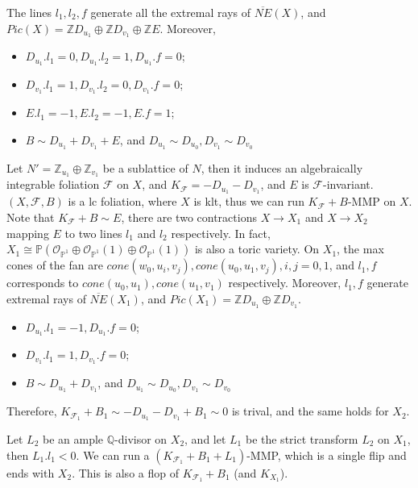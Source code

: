 \documentclass{article}
\begin{document}
The lines $l_{1},l_{2},f$ generate all the extremal rays of $ \overline{NE}(X)$, and $Pic(X)=\mathbb{Z}D_{u_{1}} \oplus \mathbb{Z}D_{v_{1}} \oplus \mathbb{Z}E$. Moreover,
\begin{itemize}
  \item $D_{u_{1}}.l_{1}=0,D_{u_{1}}.l_{2}=1,D_{u_{1}}.f=0$;
  \item $D_{v_{1}}.l_{1}=1,D_{v_{1}}.l_{2}=0,D_{v_{1}}.f=0$;
  \item $E.l_{1}=-1,E.l_{2}=-1,E.f=1$;
  \item $B\sim D_{u_{1}}+D_{v_{1}}+E$, and $D_{u_{1}}\sim D_{u_{0}},D_{v_{1}}\sim D_{v_{0}}$
\end{itemize}
Let $N'=\mathbb{Z}_{u_{1}} \oplus \mathbb{Z}_{v_{1}}$ be a sublattice of  $N$, then it induces an algebraically integrable foliation $\mathcal{F}$ on  $X$, and $K_{\mathcal{F}}=-D_{u_{1}}-D_{v_{1}}$, and $E$ is $\mathcal{F}$-invariant. $(X,\mathcal{F},B)$ is a lc foliation, where  $X$ is klt, thus we can run $K_{\mathcal{F}}+B$-MMP on $X$. Note that $K_{\mathcal{F}}+B\sim E$, there are two contractions $X\to X_{1}$ and $X \to X_{2}$  mapping $E$  to two lines $l_{1}$ and $l_{2}$ respectively.
In fact, $X_{1} \cong \mathbb{P}(\mathcal{O}_{\mathbb{P}^{1}}\oplus\mathcal{O}_{\mathbb{P}^{1}}(1)\oplus\mathcal{O}_{\mathbb{P}^{1}}(1))$ is also a toric variety.
On $X_{1}$, the max cones of the fan are $cone(w_{0},u_{i},v_{j}),cone(u_{0},u_{1},v_{j}),i,j=0,1$, and $l_{1},f$ corresponds to $cone(u_{0},u_{1}),cone(u_{1},v_{1})$ respectively. Moreover, $l_{1},f$ generate extremal rays of $ \overline{NE}(X_{1})$, and $Pic(X_{1})=\mathbb{Z}D_{u_{1}} \oplus \mathbb{Z}D_{v_{1}}$.
\begin{itemize}
  \item $D_{u_{1}}.l_{1}=-1,D_{u_{1}}.f=0$;
  \item $D_{v_{1}}.l_{1}=1,D_{v_{1}}.f=0$;
  \item $B\sim D_{u_{1}}+D_{v_{1}}$, and $D_{u_{1}}\sim D_{u_{0}},D_{v_{1}}\sim D_{v_{0}}$
\end{itemize}
Therefore, $K_{\mathcal{F}_{1}}+B_{1}\sim -D_{u_{1}}-D_{v_{1}}+B_{1}\sim 0$ is trival, and the same holds for $X_{2}$.

Let $L_{2}$ be an ample $\mathbb{Q}$-divisor on $X_{2}$, and let $L_{1}$ be the strict transform $L_{2}$ on $X_{1}$, then $L_{1}.l_{1}<0$. We can run a $( K_{\mathcal{F}_{1}}+B_{1}+L_{1} )$-MMP, which is a single flip and ends with $X_{2}$. This is also a flop of $K_{\mathcal{F}_{1}}+B_{1}$ (and $K_{X_{1}}$).
\end{document}
